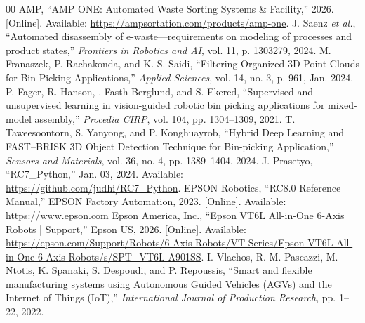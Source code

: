 \documentclass[11pt,conference]{IEEEtran}
\begin{document}
\begin{thebibliography}{00}
AMP, ``AMP ONE: Automated Waste Sorting Systems \& Facility,'' 2026. [Online]. Available: \url{https://ampsortation.com/products/amp-one}.
J. Saenz \textit{et al.}, ``Automated disassembly of e-waste---requirements on modeling of processes and product states,'' \textit{Frontiers in Robotics and AI}, vol. 11, p. 1303279, 2024.
M. Franaszek, P. Rachakonda, and K. S. Saidi, ``Filtering Organized 3D Point Clouds for Bin Picking Applications,'' \textit{Applied Sciences}, vol. 14, no. 3, p. 961, Jan. 2024.
P. Fager, R. Hanson, \text{\AA}. Fasth-Berglund, and S. Ekered, ``Supervised and unsupervised learning in vision-guided robotic bin picking applications for mixed-model assembly,'' \textit{Procedia CIRP}, vol. 104, pp. 1304--1309, 2021.
T. Taweesoontorn, S. Yanyong, and P. Konghuayrob, ``Hybrid Deep Learning and FAST--BRISK 3D Object Detection Technique for Bin-picking Application,'' \textit{Sensors and Materials}, vol. 36, no. 4, pp. 1389--1404, 2024.
J. Prasetyo, ``RC7\_Python,'' Jan. 03, 2024. Available: \url{https://github.com/judhi/RC7_Python}.
 EPSON Robotics, ``RC8.0 Reference Manual,'' EPSON Factory Automation, 2023. [Online]. Available: https://www.epson.com
Epson America, Inc., ``Epson VT6L All-in-One 6-Axis Robots | Support,'' Epson US, 2026. [Online]. Available: \url{https://epson.com/Support/Robots/6-Axis-Robots/VT-Series/Epson-VT6L-All-in-One-6-Axis-Robots/s/SPT_VT6L-A901SS}.
I. Vlachos, R. M. Pascazzi, M. Ntotis, K. Spanaki, S. Despoudi, and P. Repoussis, ``Smart and flexible manufacturing systems using Autonomous Guided Vehicles (AGVs) and the Internet of Things (IoT),'' \textit{International Journal of Production Research}, pp. 1--22, 2022.
\end{thebibliography}
\end{document}

